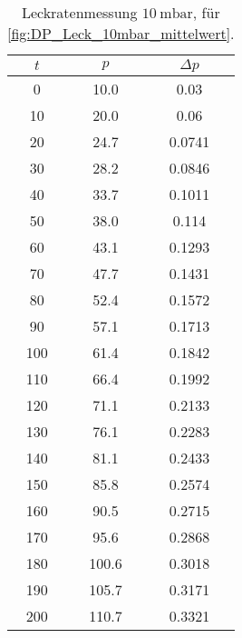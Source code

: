 \begin{table}[H]
    \centering
    \caption{Leckratenmessung $\SI{10}{\milli\bar}$, für  \autoref{fig:DP_Leck_10mbar_mittelwert}.}
    \label{tab:}
    \begin{tabular}{c c c}
        \toprule
        {$t$} & {$p$} & {$\Delta p$} \\
        \midrule
        0 & 10.0 & 0.03 \\
        10 & 20.0 & 0.06\\
        20 & 24.7 & 0.0741\\
        30 & 28.2 & 0.0846\\
        40 & 33.7 & 0.1011\\
        50 & 38.0 & 0.114\\
        60 & 43.1 & 0.1293\\
        70 & 47.7 & 0.1431\\
        80 & 52.4 & 0.1572\\
        90 & 57.1 & 0.1713\\
        100 & 61.4 & 0.1842\\
        110 & 66.4 & 0.1992\\
        120 & 71.1 & 0.2133\\
        130 & 76.1 & 0.2283\\
        140 & 81.1 & 0.2433\\
        150 & 85.8 & 0.2574\\
        160 & 90.5 & 0.2715\\
        170 & 95.6 & 0.2868\\
        180 & 100.6 & 0.3018\\
        190 & 105.7 & 0.3171\\
        200 & 110.7 & 0.3321\\
        \bottomrule
    \end{tabular}
\end{table}

